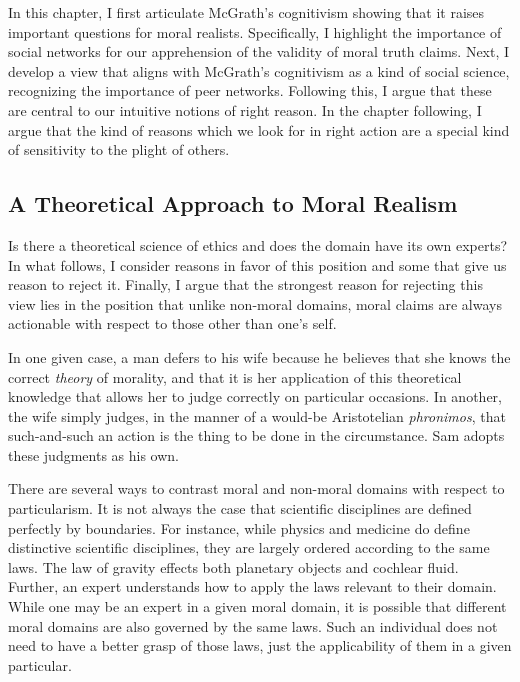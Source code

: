 \documentclass[
  letterpaper,
  DIV=11,
  numbers=noendperiod]{scrartcl}
\theoremstyle{remark}
\begin{document}
In this chapter, I first articulate McGrath's cognitivism showing that
it raises important questions for moral realists. Specifically, I
highlight the importance of social networks for our apprehension of the
validity of moral truth claims. Next, I develop a view that aligns with
McGrath's cognitivism as a kind of social science, recognizing the
importance of peer networks. Following this, I argue that these are
central to our intuitive notions of right reason. In the chapter
following, I argue that the kind of reasons which we look for in right
action are a special kind of sensitivity to the plight of others.

\subsection{A Theoretical Approach to Moral
Realism}\label{a-theoretical-approach-to-moral-realism}

Is there a theoretical science of ethics and does the domain have its
own experts? In what follows, I consider reasons in favor of this
position and some that give us reason to reject it. Finally, I argue
that the strongest reason for rejecting this view lies in the position
that unlike non-moral domains, moral claims are always actionable with
respect to those other than one's self.

In one given case, a man defers to his wife because he believes that she
knows the correct \emph{theory} of morality, and that it is her
application of this theoretical knowledge that allows her to judge
correctly on particular occasions. In another, the wife simply judges,
in the manner of a would-be Aristotelian \emph{phronimos}, that
such-and-such an action is the thing to be done in the circumstance. Sam
adopts these judgments as his own.

There are several ways to contrast moral and non-moral domains with
respect to particularism. It is not always the case that scientific
disciplines are defined perfectly by boundaries. For instance, while
physics and medicine do define distinctive scientific disciplines, they
are largely ordered according to the same laws. The law of gravity
effects both planetary objects and cochlear fluid. Further, an expert
understands how to apply the laws relevant to their domain. While one
may be an expert in a given moral domain, it is possible that different
moral domains are also governed by the same laws. Such an individual
does not need to have a better grasp of those laws, just the
applicability of them in a given particular.
\end{document}
